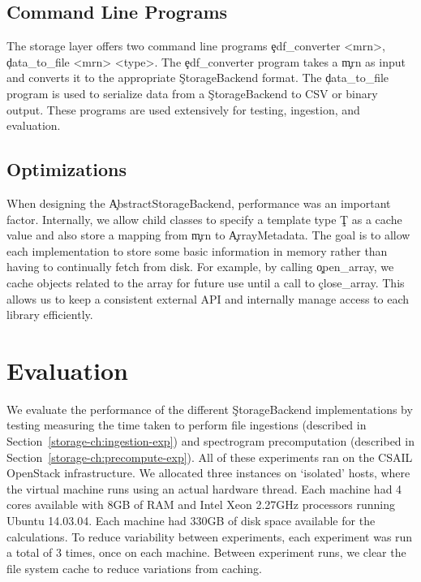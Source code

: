 \subsection{Command Line Programs}\label{storage-ch:implementation-cmd}

The storage layer offers two command line programs \c{edf\_converter <mrn>},
\c{data\_to\_file <mrn> <type>}. The \c{edf\_converter} program takes a \c{mrn}
as input and converts it to the appropriate \c{StorageBackend} format. The
\c{data\_to\_file} program is used to serialize data from a \c{StorageBackend}
to CSV or binary output. These programs are used extensively for testing,
ingestion, and evaluation.

\subsection{Optimizations}\label{storage-ch:opt}

When designing the \c{AbstractStorageBackend}, performance was an important
factor. Internally, we allow child classes to specify a template type \c{T} as
a cache value and also store a mapping from \c{mrn} to \c{ArrayMetadata}. The
goal is to allow each implementation to store some basic information in memory
rather than having to continually fetch from disk. For example, by calling 
\c{open\_array}, we cache objects related to the array for future
use until a call to \c{close\_array}. This allows us to keep a consistent
external API and internally manage access to each library efficiently.

\section{Evaluation}\label{storage-ch:evaluation}

We evaluate the performance of the different \c{StorageBackend} implementations
by testing measuring the time taken to perform file ingestions (described in
Section~\ref{storage-ch:ingestion-exp}) and spectrogram precomputation
(described in Section~\ref{storage-ch:precompute-exp}). All of these
experiments ran on the CSAIL OpenStack infrastructure. We allocated three
instances on `isolated' hosts, where the virtual machine runs using an actual
hardware thread. Each machine had 4 cores available with 8GB of RAM and Intel
Xeon 2.27GHz processors running Ubuntu 14.03.04. Each machine had 330GB of disk
space available for the calculations. To reduce variability between
experiments, each experiment was run a total of 3 times, once on each machine.
Between experiment runs, we clear the file system cache to reduce variations
from caching. \\

